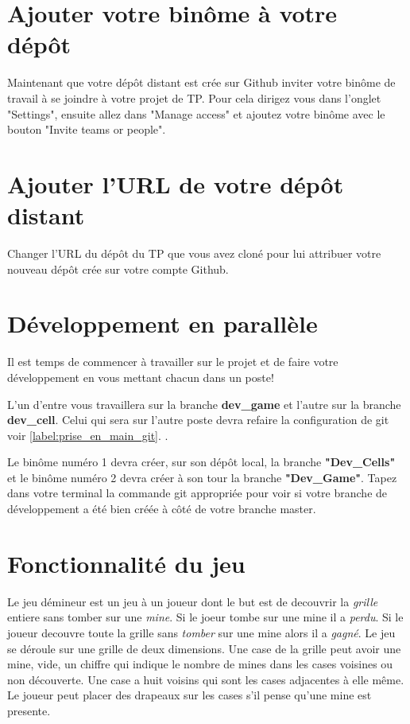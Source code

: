 \section{Ajouter votre binôme à votre dépôt}

Maintenant que votre dépôt distant est crée sur Github inviter votre binôme de travail à se joindre à votre projet de TP. Pour cela dirigez vous dans l'onglet "Settings", ensuite allez dans "Manage access" et ajoutez votre binôme avec le bouton "Invite teams or people".

\section{Ajouter l'URL de votre dépôt distant}

Changer l'URL du dépôt du TP que vous avez cloné pour lui attribuer votre nouveau dépôt crée sur votre compte Github. %

\medskip

%
%

\section{Développement en parallèle}

Il est temps de commencer à travailler sur le projet et de faire votre développement en vous mettant chacun dans un poste! %

\medskip

L'un d'entre vous travaillera sur la branche \textbf{dev\_game} et l'autre sur la branche \textbf{dev\_cell}. Celui qui sera sur l'autre poste devra refaire la configuration de git voir \ref{label:prise_en_main_git}. .

Le binôme numéro 1 devra créer, sur son dépôt local, la branche \textbf{"Dev\_Cells"} et le binôme numéro 2 devra créer à son tour la branche \textbf{"Dev\_Game"}. Tapez dans votre terminal la commande git appropriée pour voir si votre branche de développement a été bien créée à côté de votre branche master.

\section{Fonctionnalité du jeu}
Le jeu démineur est un jeu à un joueur dont le but est de decouvrir la \textit{grille} entiere sans tomber sur une \textit{mine}. Si le joeur tombe sur une mine il a \textit{perdu}. Si le joueur decouvre toute la grille sans \textit{tomber} sur une mine alors il a \textit{gagné}. Le jeu se déroule sur une grille de deux dimensions. Une case de la grille peut avoir une mine, vide, un chiffre qui indique le nombre de mines dans les cases voisines ou non découverte. Une case a huit voisins qui sont les cases adjacentes à elle même. Le joueur peut placer des drapeaux sur les cases s'il pense qu'une mine est presente.

